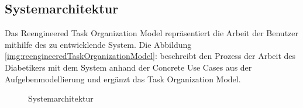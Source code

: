 \subsection{Systemarchitektur}
Das Reengineered Task Organization Model repräsentiert die Arbeit der Benutzer mithilfe des zu entwicklende System. Die Abbildung \ref{img:reengineeredTaskOrganizationModel}:  beschreibt den Prozess der Arbeit des Diabetikers mit dem System anhand der Concrete Use Cases aus der Aufgebenmodellierung und ergänzt das Task Organization Model.
\begin{figure}[H]
	\centering
	\setlength{\fboxsep}{1pt}
	\setlength{\fboxrule}{1pt}
	\captionsetup{justification=centering}
	\caption{Systemarchitektur}
	\label{img:Systemarchitektur}
\end{figure}
